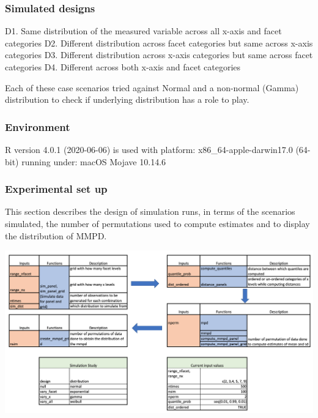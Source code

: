 \documentclass[
]{article}
\begin{document}
\hypertarget{simulated-designs}{%
\subsubsection{Simulated designs}\label{simulated-designs}}

D1. Same distribution of the measured variable across all x-axis and facet categories
D2. Different distribution across facet categories but same across x-axis categories
D3. Different distribution across x-axis categories but same across facet categories
D4. Different across both x-axis and facet categories

Each of these case scenarios tried against Normal and a non-normal (Gamma) distribution to check if underlying distribution has a role to play.

\hypertarget{environment}{%
\subsubsection{Environment}\label{environment}}

R version 4.0.1 (2020-06-06) is used with platform: x86\_64-apple-darwin17.0 (64-bit) running under: macOS Mojave 10.14.6

\hypertarget{experimental-set-up}{%
\subsubsection{Experimental set up}\label{experimental-set-up}}

This section describes the design of simulation runs, in terms of the scenarios simulated, the number of permutations used to compute estimates and to display the distribution of MMPD.

\begin{center}\includegraphics[width=\textwidth]{Figs/simulation} \end{center}
\end{document}
